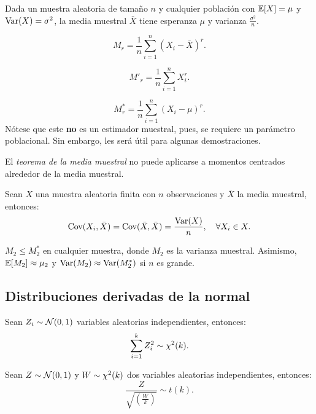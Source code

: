 \documentclass[8pt,a4paper]{extarticle}
\begin{document}
\begin{multicols}{3}
	\begin{boxtheo}
		Dada un muestra aleatoria de tamaño $n$ y cualquier población con $\mathbb{E} [X] = \mu$ y $\text{\normalfont Var}(X) = \sigma^2$, la media muestral $\bar{X}$ tiene esperanza $\mu$ y varianza $\displaystyle \frac{\sigma^2}{n}$.
	\end{boxtheo}

	\begin{boxdef}
		\[M_r = \frac{1}{n}\sum_{i = 1}^n \left( X_i - \bar{X} \right)^r.\]
	\end{boxdef}

	\begin{boxdef}
		\[M'_r = \frac{1}{n}\sum_{i = 1}^n X_i^r.\]
	\end{boxdef}

	\begin{boxdef}
		\[M^*_r = \frac{1}{n}\sum_{i = 1}^n \left( X_i - \mu \right)^r.\]
		Nótese que este \textbf{no} es un estimador muestral, pues, se requiere un parámetro poblacional. Sin embargo, les será útil para algunas demostraciones.
	\end{boxdef}

	\begin{boxrmk}
		El \emph{teorema de la media muestral} no puede aplicarse a momentos centrados alrededor de la media muestral.
	\end{boxrmk}

	\begin{boxprop}
		Sean $X$ una muestra aleatoria finita con $n$ observaciones y $\bar{X}$ la media muestral, entonces:
		\[\text{\normalfont Cov}(X_i,\bar{X}) = \text{\normalfont Cov}(\bar{X},\bar{X}) = \frac{\text{\normalfont Var}(X)}{n}, \quad \forall X_i \in X.\]
	\end{boxprop}

	\begin{boxprop}
		$M_2 \leq M^*_2$ en cualquier muestra, donde $M_2$ es la varianza muestral. Asimismo, $\mathbb{E}[M_2] \approx \mu_2$ y $\text{\normalfont Var}(M_2) \approx \text{\normalfont Var}(M^*_2)$ si $n$ es grande.
	\end{boxprop}

	\subsection*{Distribuciones derivadas de la normal}

	\begin{bulletlist}
		\item Sean $Z_i \sim \mathcal{N}(0,1)$ variables aleatorias independientes, entonces: \[ \sum_{i =1}^{k} Z_i^2 \sim \chi^2 (k).\]
		\item Sean $Z \sim \mathcal{N}(0,1)$ y $W \sim \chi^2(k)$ dos variables aleatorias independientes, entonces: \[\frac{Z}{\sqrt{\left(\displaystyle \frac{W}{k}\right)}} \sim t(k).\]
	\end{bulletlist}


\end{multicols}
\end{document}
